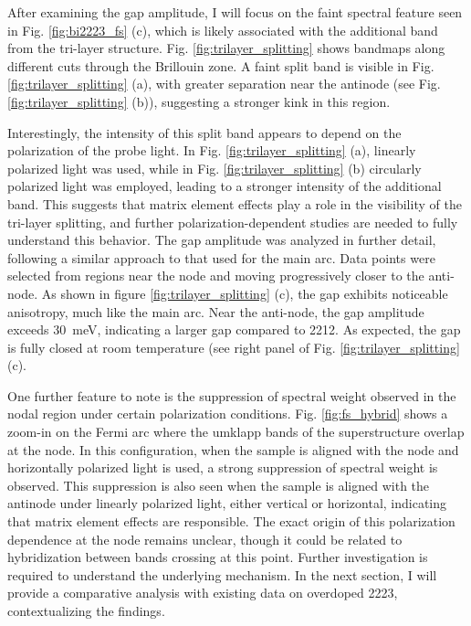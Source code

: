 After examining the gap amplitude, I will focus on the faint spectral feature seen in Fig. \ref{fig:bi2223_fs} (c), which is likely associated with the additional band from the tri-layer structure.
Fig. \ref{fig:trilayer_splitting} shows bandmaps along different cuts through the Brillouin zone.
A faint split band is visible in Fig. \ref{fig:trilayer_splitting} (a), with greater separation near the antinode (see Fig. \ref{fig:trilayer_splitting} (b)), suggesting a stronger kink in this region.

Interestingly, the intensity of this split band appears to depend on the polarization of the probe light.
In Fig. \ref{fig:trilayer_splitting} (a), linearly polarized light was used, while in Fig. \ref{fig:trilayer_splitting} (b) circularly polarized light was employed, leading to a stronger intensity of the additional band.
This suggests that matrix element effects play a role in the visibility of the tri-layer splitting, and further polarization-dependent studies are needed to fully understand this behavior.
The gap amplitude was analyzed in further detail, following a similar approach to that used for the main arc.
Data points were selected from regions near the node and moving progressively closer to the anti-node.
As shown in figure \ref{fig:trilayer_splitting} (c), the gap exhibits noticeable anisotropy, much like the main arc.
Near the anti-node, the gap amplitude exceeds \qty{30}{\milli\electronvolt}, indicating a larger gap compared to 2212.
As expected, the gap is fully closed at room temperature (see right panel of Fig. \ref{fig:trilayer_splitting} (c).

One further feature to note is the suppression of spectral weight observed in the nodal region under certain polarization conditions.
Fig. \ref{fig:fs_hybrid} shows a zoom-in on the Fermi arc where the umklapp bands of the superstructure overlap at the node.
In this configuration, when the sample is aligned with the node and horizontally polarized light is used, a strong suppression of spectral weight is observed.
This suppression is also seen when the sample is aligned with the antinode under linearly polarized light, either vertical or horizontal, indicating that matrix element effects are responsible.
The exact origin of this polarization dependence at the node remains unclear, though it could be related to hybridization between bands crossing at this point.
Further investigation is required to understand the underlying mechanism.
In the next section, I will provide a comparative analysis with existing data on overdoped 2223, contextualizing the findings.


